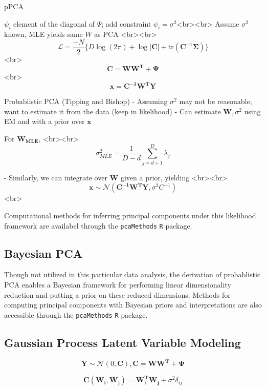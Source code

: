 \documentclass[english, 11pt]{article}\usepackage[]{graphicx}\usepackage[]{color}
\begin{document}
pPCA \cite{tipping1999probabilistic}

$\psi_i$ element of the diagonal of $\Psi$; add constraint $\psi_i = \sigma^2$<br><br>
Assume $\sigma^2$ known, MLE yields same $W$ as PCA <br><br>
$$  \mathcal{L} = \frac{-N}{2}\{ D\log(2\pi) + \log|\mathbf{C}| + \textrm{tr}(\mathbf{C}^{-1}\mathbf{\Sigma})  \}   $$<br>
$$\mathbf{C} = \mathbf{WW^T }+ \mathbf{\Psi} $$ <br>
$$  \mathbf{x} = \mathbf{C^{-1}W^{T}Y}$$

Probablistic PCA (Tipping and Bishop)
- Assuming $\sigma^2$ may not be reasonable; want to estimate it from the data (keep in likelihood)
- Can estimate $\mathbf{W}, \sigma^2$ using EM and with a prior over $\mathbf{x}$

For  $\mathbf{W_{\textrm{MLE}}}$, <br><br> $$\sigma_{MLE}^2 = \frac{1}{D-d} \sum_{j = d +1}^D \lambda_j $$

- Similarly, we can integrate over $\mathbf{W}$ given a prior, yielding <br><br>
$$  \mathbf{x} \sim  \mathcal{N} (\mathbf{C^{-1}W^{T}Y}, \sigma^2C^{-1})$$ <br>


Computational methods for inferring principal components under this likelihood framework are availabel through the \texttt{pcaMethods} \texttt{R} package.

\subsection{Bayesian PCA}
Though not utilized in this particular data analysis, the derivation of probablistic PCA enables a Bayesian framework for performing linear dimensionality reduction and putting a prior on these reduced dimensions. \cite{bishop1999bayesian} Methods for computing principal components with Bayesian priors and interpretations are also accessible through the \texttt{pcaMethods} \texttt{R} package.

\subsection{Gaussian Process Latent Variable Modeling}

\begin{equation}
\mathbf{Y} \sim  \mathcal{N} (0, \mathbf{C}), \mathbf{C} = \mathbf{WW^T }+ \mathbf{\Psi}
\end{equation}

\begin{equation}
\mathbf{C}(\mathbf{W_i},\mathbf{W_j}) = \mathbf{W_i^T}\mathbf{W_j} + \sigma^2\delta_{ij}
\end{equation}
\end{document}
